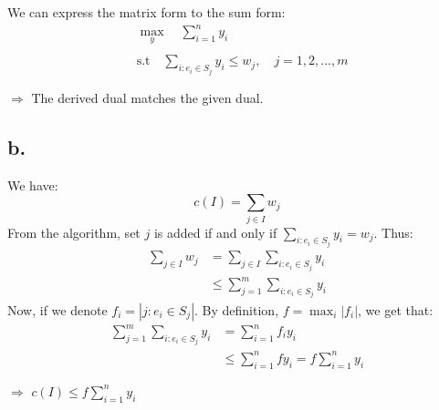 \documentclass{article}
\begin{document}
We can express the matrix form to the sum form:
\[
\begin{aligned}
&\max_y \quad \sum_{i=1}^{n}y_i \\\\
&\text{s.t} \quad \sum_{i:e_{i} \in S_j} y_{i} \leq w_j, \quad j = 1, 2, ..., m \\\\
\end{aligned} 
\]
$\Rightarrow$ The derived dual matches the given dual.

\pagebreak
\subsection*{b.}
We have:
\[
c(I) = \sum_{j \in I}w_j
\]
From the algorithm, set $j$ is added if and only if $\sum_{i:e_i \in S_j} y_i = w_j$. Thus:
\[
\begin{aligned}
\sum_{j \in I}w_j &= \sum_{j \in I} \sum_{i:e_i \in S_j}y_i \\
                           &\leq \sum_{j=1}^{m}\sum_{i:e_i \in S_j}y_i
\end{aligned}
\]
Now, if we denote $f_i = |{j:e_i\in S_j}|$. By definition, $f = \max_{i}|f_i|$, we get that:
\[
\begin{aligned}
\sum_{j=1}^{m}\sum_{i:e_i \in S_j}y_i &= \sum_{i=1}^{n} f_{i} y_{i} \\
                                                             &\leq \sum_{i=1}^{n}fy_{i} = f \sum_{i=1}^{n}y_{i} \\\\
\end{aligned}
\]
$\Longrightarrow$ $c(I) \leq f \sum_{i=1}^{n}y_{i}$

\pagebreak
\end{document}
